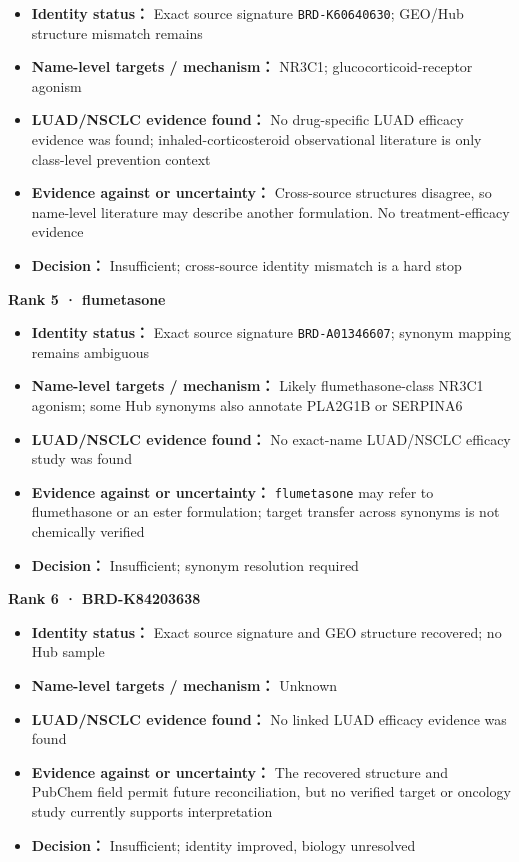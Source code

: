 \documentclass[
  10pt,
]{ctexart}
\providecommand{\tightlist}{%
  \setlength{\itemsep}{0pt}\setlength{\parskip}{0pt}}
\begin{document}
\begin{itemize}
\tightlist
\item
  \textbf{Identity status：} Exact source signature
  \texttt{BRD-K60640630}; GEO/Hub structure mismatch remains
\item
  \textbf{Name-level targets / mechanism：} NR3C1;
  glucocorticoid-receptor agonism
\item
  \textbf{LUAD/NSCLC evidence found：} No drug-specific LUAD efficacy
  evidence was found; inhaled-corticosteroid observational literature is
  only class-level prevention context
\item
  \textbf{Evidence against or uncertainty：} Cross-source structures
  disagree, so name-level literature may describe another formulation.
  No treatment-efficacy evidence
\item
  \textbf{Decision：} Insufficient; cross-source identity mismatch is a
  hard stop
\end{itemize}

\textbf{Rank 5 · flumetasone}

\begin{itemize}
\tightlist
\item
  \textbf{Identity status：} Exact source signature
  \texttt{BRD-A01346607}; synonym mapping remains ambiguous
\item
  \textbf{Name-level targets / mechanism：} Likely flumethasone-class
  NR3C1 agonism; some Hub synonyms also annotate PLA2G1B or SERPINA6
\item
  \textbf{LUAD/NSCLC evidence found：} No exact-name LUAD/NSCLC efficacy
  study was found
\item
  \textbf{Evidence against or uncertainty：} \texttt{flumetasone} may
  refer to flumethasone or an ester formulation; target transfer across
  synonyms is not chemically verified
\item
  \textbf{Decision：} Insufficient; synonym resolution required
\end{itemize}

\textbf{Rank 6 · BRD-K84203638}

\begin{itemize}
\tightlist
\item
  \textbf{Identity status：} Exact source signature and GEO structure
  recovered; no Hub sample
\item
  \textbf{Name-level targets / mechanism：} Unknown
\item
  \textbf{LUAD/NSCLC evidence found：} No linked LUAD efficacy evidence
  was found
\item
  \textbf{Evidence against or uncertainty：} The recovered structure and
  PubChem field permit future reconciliation, but no verified target or
  oncology study currently supports interpretation
\item
  \textbf{Decision：} Insufficient; identity improved, biology
  unresolved
\end{itemize}
\end{document}
